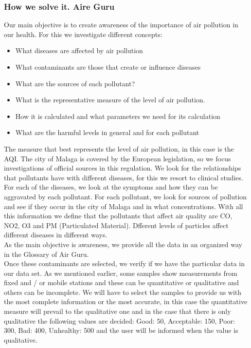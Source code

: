 \subsubsection{How we solve it. Aire Guru} 
Our main objective is to create awareness of the importance of air pollution in our health. For this we investigate different concepts:
\begin{itemize}
    \item What diseases are affected by air pollution
    \item What contaminants are those that create or influence diseases
    \item What are the sources of each pollutant?
    \item What is the representative measure of the level of air pollution.
    \item How it is calculated and what parameters we need for its calculation
    \item What are the harmful levels in general and for each pollutant
\end{itemize}
The measure that best represents the level of air pollution, in this case is the AQI. The city of Malaga is covered by the European legislation, so we focus investigations of official sources in this regulation.
We look for the relationships that pollutants have with different diseases, for this we resort to clinical studies. For each of the diseases, we look at the symptoms and how they can be aggravated by each pollutant.
For each pollutant, we look for sources of pollution and see if they occur in the city of Malaga and in what concentrations.
With all this information we define that the pollutants that affect air quality are CO, NO2, O3 and PM (Particulated Material). Dfferent levels of particles
affect different diseases in different ways. \\

As the main objective is awareness, we provide all the data in an organized way in the Glossary of Air Guru. \\

Once these contaminants are selected, we verify if we have the particular data in our data set. As we mentioned earlier, some samples show measurements from fixed and / or mobile stations and these can be quantitative or qualitative and others can be incomplete. We will have to select the
samples to provide us with the most complete information or the most accurate, in this case the quantitative measure will prevail to the qualitative one and in the case that there is only qualitative
the following values are decided: Good: 50, Acceptable: 150, Poor: 300, Bad: 400, Unhealthy: 500 and the user will be informed when the value is qualitative. \\


